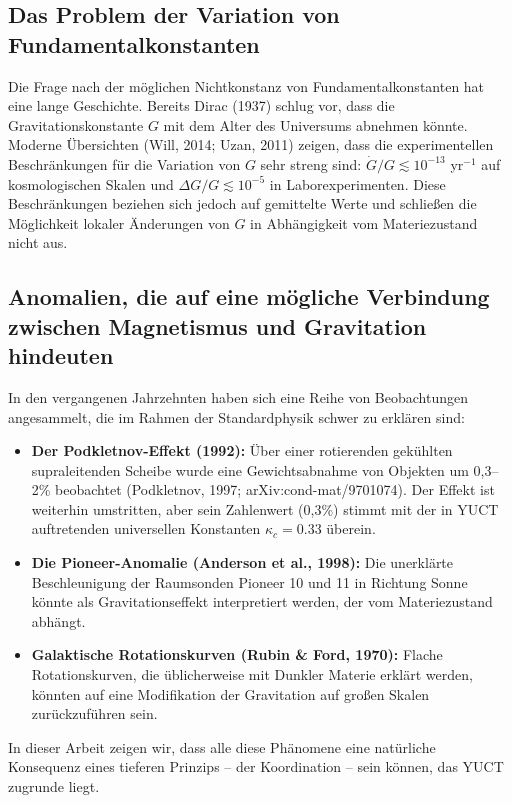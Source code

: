 \documentclass[12pt]{article}
\theoremstyle{remark}
\newcommand{\kappac}{\kappa_c}
\begin{document}
	\subsection{Das Problem der Variation von Fundamentalkonstanten}
	\label{subsec:constants-variation}
	
	Die Frage nach der möglichen Nichtkonstanz von Fundamentalkonstanten hat eine lange Geschichte. Bereits Dirac (1937) schlug vor, dass die Gravitationskonstante $G$ mit dem Alter des Universums abnehmen könnte. Moderne Übersichten (Will, 2014; Uzan, 2011) zeigen, dass die experimentellen Beschränkungen für die Variation von $G$ sehr streng sind: $\dot{G}/G \lesssim 10^{-13}$ yr$^{-1}$ auf kosmologischen Skalen und $\Delta G/G \lesssim 10^{-5}$ in Laborexperimenten. Diese Beschränkungen beziehen sich jedoch auf gemittelte Werte und schließen die Möglichkeit lokaler Änderungen von $G$ in Abhängigkeit vom Materiezustand nicht aus.
	
	\subsection{Anomalien, die auf eine mögliche Verbindung zwischen Magnetismus und Gravitation hindeuten}
	\label{subsec:anomalies}
	
	In den vergangenen Jahrzehnten haben sich eine Reihe von Beobachtungen angesammelt, die im Rahmen der Standardphysik schwer zu erklären sind:
	\begin{itemize}
		\item \textbf{Der Podkletnov-Effekt (1992):} Über einer rotierenden gekühlten supraleitenden Scheibe wurde eine Gewichtsabnahme von Objekten um 0,3–2\% beobachtet (Podkletnov, 1997; arXiv:cond-mat/9701074). Der Effekt ist weiterhin umstritten, aber sein Zahlenwert (0,3\%) stimmt mit der in YUCT auftretenden universellen Konstanten $\kappac = 0.33$ überein.
		\item \textbf{Die Pioneer-Anomalie (Anderson et al., 1998):} Die unerklärte Beschleunigung der Raumsonden Pioneer 10 und 11 in Richtung Sonne könnte als Gravitationseffekt interpretiert werden, der vom Materiezustand abhängt.
		\item \textbf{Galaktische Rotationskurven (Rubin \& Ford, 1970):} Flache Rotationskurven, die üblicherweise mit Dunkler Materie erklärt werden, könnten auf eine Modifikation der Gravitation auf großen Skalen zurückzuführen sein.
	\end{itemize}
	In dieser Arbeit zeigen wir, dass alle diese Phänomene eine natürliche Konsequenz eines tieferen Prinzips – der Koordination – sein können, das YUCT zugrunde liegt.
	
\end{document}
